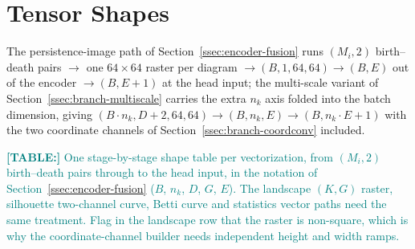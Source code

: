 \documentclass[11pt,letterpaper]{article}
\newcommand{\1}{\mathds{1}}
\newcommand{\tab}[1]{\textcolor{teal}{\textbf{[TABLE:] }#1}}
\newcommand{\fig}[1]{\textcolor{magenta}{\textbf{[FIGURE:] }#1}}
\newcommand{\expt}[1]{\textcolor{orange}{\textbf{[EXPT:] }#1}}
\newcommand{\tab}[1]{}\newcommand{\fig}[1]{}\newcommand{\expt}[1]{}
\theoremstyle{plain}
\theoremstyle{definitioncolon}
\begin{document}
\section{Tensor Shapes}
\label{app:tensor-shapes}

The persistence-image path of Section~\ref{ssec:encoder-fusion} runs
$(M_i, 2)$ birth--death pairs $\rightarrow$ one $64 \times 64$ raster per
diagram $\rightarrow (B, 1, 64, 64) \rightarrow (B, E)$ out of the encoder
$\rightarrow (B, E+1)$ at the head input; the multi-scale variant of
Section~\ref{ssec:branch-multiscale} carries the extra $n_k$ axis folded into
the batch dimension, giving $(B\!\cdot\!n_k, D{+}2, 64, 64) \rightarrow
(B, n_k, E) \rightarrow (B, n_k\!\cdot\!E + 1)$ with the two coordinate
channels of Section~\ref{ssec:branch-coordconv} included.

\tab{One stage-by-stage shape table per vectorization, from $(M_i, 2)$
birth--death pairs through to the head input, in the notation of
Section~\ref{ssec:encoder-fusion} ($B$, $n_k$, $D$, $G$, $E$). The landscape
$(K,G)$ raster, silhouette two-channel curve, Betti curve and statistics vector
paths need the same treatment. Flag in the landscape row that the raster is
non-square, which is why the coordinate-channel builder needs independent height
and width ramps.}
\end{document}
